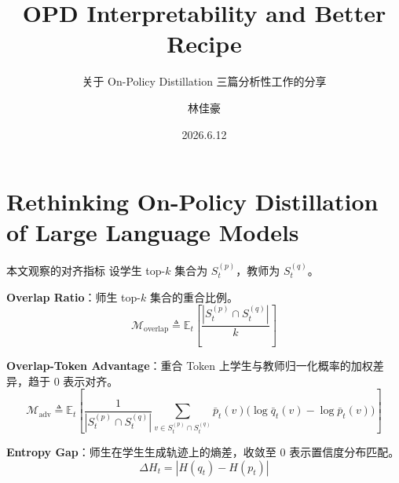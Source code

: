 \documentclass{beamer}
\title{OPD Interpretability and Better Recipe}
\subtitle{关于 On-Policy Distillation 三篇分析性工作的分享}
\author{林佳豪}
\date{2026.6.12}
\begin{document}
\maketitle

\section{Rethinking On-Policy Distillation of Large Language Models}

\begin{frame}[t]{本文观察的对齐指标}
  \small
  设学生 top-$k$ 集合为 $S_t^{(p)}$，教师为 $S_t^{(q)}$。

  \vspace{0.1cm}
  \textbf{Overlap Ratio}：师生 top-$k$ 集合的重合比例。
  \[
    \mathcal{M}_{\text{overlap}} \triangleq \mathbb{E}_{t} \left[ \frac{|S_t^{(p)} \cap S_t^{(q)}|}{k} \right]
  \]

  \textbf{Overlap-Token Advantage}：重合 Token 上学生与教师归一化概率的加权差异，趋于 $0$ 表示对齐。
  \[
    \mathcal{M}_{\text{adv}} \triangleq \mathbb{E}_{t}\!\left[ \frac{1}{|S_t^{(p)} \cap S_t^{(q)}|} \sum_{v \in S_t^{(p)} \cap S_t^{(q)}} \bar{p}_t(v) \bigl(\log \bar{q}_t(v) - \log \bar{p}_t(v)\bigr) \right]
  \]

  \textbf{Entropy Gap}：师生在学生生成轨迹上的熵差，收敛至 $0$ 表示置信度分布匹配。
  \[
    \Delta H_t = \left| H(q_t) - H(p_t) \right|
  \]
\end{frame}
\end{document}
